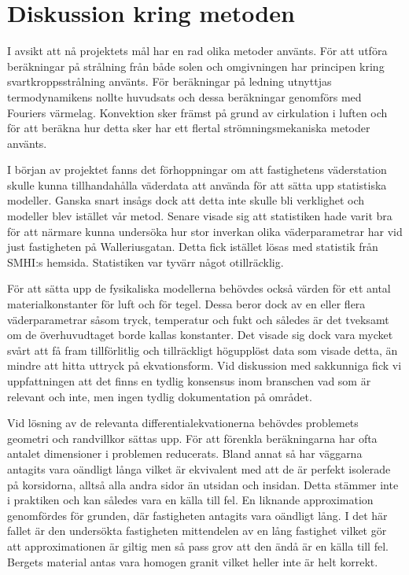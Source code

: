 \section{Diskussion kring metoden}\label{sec:discmethod}

I avsikt att nå projektets mål har en rad olika metoder använts. För att utföra beräkningar på strålning från både solen och omgivningen har principen kring svartkroppsstrålning använts. För beräkningar på ledning utnyttjas termodynamikens nollte huvudsats och dessa beräkningar genomförs med Fouriers värmelag. Konvektion sker främst på grund av cirkulation i luften och för att beräkna hur detta sker har ett flertal strömningsmekaniska metoder använts.

I början av projektet fanns det förhoppningar om att fastighetens väderstation skulle kunna tillhandahålla väderdata att använda för att sätta upp statistiska modeller. 
Ganska snart insågs dock att detta inte skulle bli verklighet och modeller blev istället vår metod. Senare visade sig att statistiken hade varit bra för att närmare kunna undersöka hur stor inverkan olika väderparametrar har vid just fastigheten på Walleriusgatan. 
Detta fick istället lösas med statistik från SMHI:s hemsida. Statistiken var tyvärr något otillräcklig.

För att sätta upp de fysikaliska modellerna behövdes också värden för ett antal materialkonstanter för luft och för tegel. 
Dessa beror dock av en eller flera väderparametrar såsom tryck, temperatur och fukt och således är det tveksamt om de överhuvudtaget borde kallas konstanter. 
Det visade sig dock vara mycket svårt att få fram tillförlitlig och tillräckligt högupplöst data som visade detta, än mindre att hitta uttryck på ekvationsform.
Vid diskussion med sakkunniga fick vi uppfattningen att det finns en tydlig konsensus inom branschen vad som är relevant och inte, men ingen tydlig dokumentation på området.

Vid lösning av de relevanta differentialekvationerna behövdes problemets geometri och randvillkor sättas upp. För
att förenkla beräkningarna har ofta antalet dimensioner i problemen reducerats. Bland annat så har väggarna antagits vara oändligt
långa vilket är ekvivalent med att de är perfekt isolerade på korsidorna, alltså alla andra sidor än utsidan och insidan. Detta stämmer inte
i praktiken och kan således vara en källa till fel. En liknande approximation genomfördes för grunden, där fastigheten
antagits vara oändligt lång. I det här fallet är den undersökta fastigheten mittendelen av en lång fastighet vilket
gör att approximationen är giltig men så pass grov att den ändå är en källa till fel. Bergets material antas vara homogen granit vilket
heller inte är helt korrekt. 

